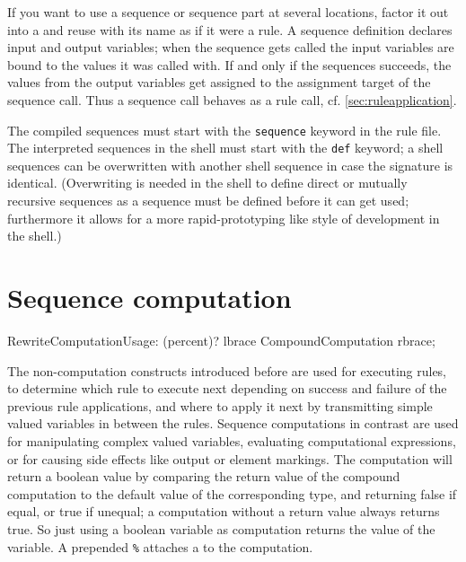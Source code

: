If you want to use a sequence or sequence part at several locations, factor it out into a  and reuse with its name as if it were a rule.
A sequence definition declares input and output variables; 
when the sequence gets called the input variables are bound to the values it was called with.
If and only if the sequences succeeds, the values from the output variables get assigned to the assignment target of the sequence call.
Thus a sequence call behaves as a rule call, cf. \ref{sec:ruleapplication}.

The compiled sequences must start with the \texttt{sequence} keyword in the rule file.
The interpreted sequences in the shell must start with the \texttt{def} keyword; a shell sequences can be overwritten with another shell sequence in case the signature is identical. (Overwriting is needed in the shell to define direct or mutually recursive sequences as a sequence must be defined before it can get used; furthermore it allows for a more rapid-prototyping like style of development in the shell.)


\section{Sequence computation} \label{sec:seqcomp}

\begin{rail} 
  RewriteComputationUsage: (percent)? lbrace CompoundComputation rbrace; 
\end{rail}

The non-computation constructs introduced before are used for executing rules, to determine which rule to execute next depending on success and failure of the previous rule applications, and where to apply it next by transmitting simple valued variables in between the rules.
Sequence computations in contrast are used for manipulating complex valued variables, evaluating computational expressions, or for causing side effects like output or element markings.
The computation will return a boolean value by comparing the return value of the compound computation to the default value of the corresponding type, and returning false if equal, or true if unequal; a computation without a return value always returns true.
So just using a boolean variable as computation returns the value of the variable.
A prepended \texttt{\%} attaches a  to the computation.

